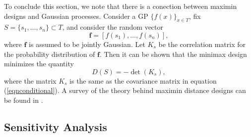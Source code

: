 \documentclass{sfuthesis}
\begin{document}
To conclude this section, we note that there is a conection between maximin designs and Gaussian processes. 
Consider a
GP $\{f(x)\}_{x\in T}$, fix $S=\{s_{1},\ldots,s_{n}\}\subset T$,  and consider the random vector
\begin{equation*}
\textbf{f}=[f(s_{1}),\ldots,f(s_{n})],
\end{equation*}
where $\textbf{f}$ is assumed to be jointly Gaussian. Let $K_{s}$ be 
the correlation matrix for the probability distribution of $\textbf{f}$. Then it can be shown
that the minimax design minimizes the quantity 
\begin{equation*}
D(S)=-\det(K_{s}),
\end{equation*}
where the matrix $K_{s}$ is the same as the covariance matrix in equation (\ref{eqnconditional}).
A survey of the theory behind maximin distance designs can be found in \cite{johnson1990minimax}.
\newline




\subsection{Sensitivity Analysis}\label{subsecSensitivity}
\end{document}

